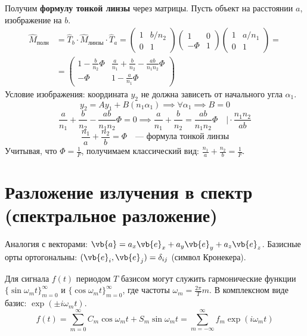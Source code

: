 Получим \textbf{формулу тонкой линзы} через матрицы. Пусть объект на расстоянии $a$, изображение на $b$.
\begin{align*}
	\hat{M}_{\text{полн}} &= \hat{T}_b \cdot \hat{M}_{\text{линзы}} \cdot \hat{T}_a = \begin{pmatrix} 1 & b/n_2 \\ 0 & 1 \end{pmatrix} \begin{pmatrix} 1 & 0 \\ -\Phi & 1 \end{pmatrix} \begin{pmatrix} 1 & a/n_1 \\ 0 & 1 \end{pmatrix} = \\
	&= \begin{pmatrix} 1 - \frac{b}{n_2}\Phi & \frac{a}{n_1} + \frac{b}{n_2} - \frac{ab}{n_1 n_2}\Phi \\ -\Phi & 1 - \frac{a}{n_1}\Phi \end{pmatrix}
\end{align*}
Условие изображения: координата $y_2$ не должна зависеть от начального угла $\alpha_1$. 
\begin{equation*}
	y_2 = A y_1 + B (n_1\alpha_1) \implies \forall \alpha_1 \implies B = 0
\end{equation*}
\begin{equation*}
	\frac{a}{n_1} + \frac{b}{n_2} - \frac{ab}{n_1 n_2}\Phi = 0 \implies \frac{a}{n_1} + \frac{b}{n_2} = \frac{ab}{n_1 n_2}\Phi \quad \Big| \cdot \frac{n_1 n_2}{ab}
\end{equation*}
\begin{equation}
	\frac{n_1}{a} + \frac{n_2}{b} = \Phi \quad \text{--- формула тонкой линзы}
\end{equation}
Учитывая, что $\Phi = \frac{1}{F}$, получимаем классический вид: $\frac{n_1}{a} + \frac{n_2}{b} = \frac{1}{F}$.

\section{Разложение излучения в спектр (спектральное разложение)}

Аналогия с векторами: $\vb{a} = a_x \vb{e}_x + a_y \vb{e}_y + a_z \vb{e}_z$. Базисные орты ортогональны: $(\vb{e}_i, \vb{e}_j) = \delta_{ij}$ (символ Кронекера).

Для сигнала $f(t)$ периодом $T$ базисом могут служить гармонические функции $\{\sin \omega_m t\}_{m=0}^\infty$ и $\{\cos \omega_m t\}_{m=0}^\infty$, где частоты $\omega_m = \frac{2\pi}{T}m$. В комплексном виде базис: $\exp(\pm i\omega_m t)$.
\begin{equation*}
	f(t) = \sum_{m=0}^\infty C_m \cos\omega_m t + S_m \sin\omega_m t = \sum_{m=-\infty}^\infty f_m \exp(i\omega_m t)
\end{equation*}

